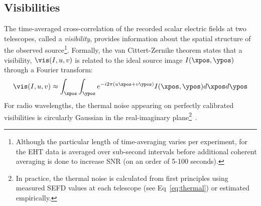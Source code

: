 \subsection{Visibilities }
\label{sec:vis}


The time-averaged cross-correlation of the recorded scalar electric fields at two telescopes, called a {\it visibility}, provides information about the spatial structure of the observed source\footnote{Although the particular length of time-averaging varies per experiment, for the EHT data is averaged over sub-second intervals before additional coherent averaging is done to increase SNR (on an order of 5-100 seconds).}. Formally, the van Cittert-Zernike theorem states that a visibility, $\vis(I, u,v)$ is related to the ideal source image $I(\xpos, \ypos)$ through a Fourier transform: 
\begin{align}
\vis(I, u,v) \approx \int_{\xpos} \int_{\ypos} e^{-i2 \pi (u\xpos + v \ypos) } I(\xpos, \ypos) d\xpos d\ypos
\label{eq:vcz}
\end{align}
For radio wavelengths, the thermal noise appearing on perfectly calibrated visibilities is 
circularly Gaussian in the real-imaginary plane\footnote{In practice, the thermal noise is calculated from first principles using measured SEFD values at each telescope (see Eq~\ref{eq:thermal}) or estimated empirically. }~\cite{taylor1999synthesis}.





